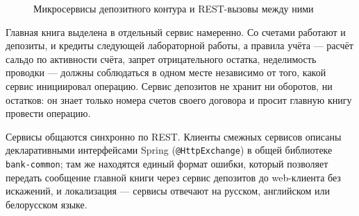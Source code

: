 \documentclass[14pt,a4paper]{extarticle}
\begin{document}
\begin{figure}[H]
\centering
{}
\caption{Микросервисы депозитного контура и REST-вызовы между ними}
\label{fig:services}
\end{figure}

Главная книга выделена в отдельный сервис намеренно. Со счетами работают и депозиты, и
кредиты следующей лабораторной работы, а правила учёта --- расчёт сальдо по активности
счёта, запрет отрицательного остатка, неделимость проводки --- должны соблюдаться в одном
месте независимо от того, какой сервис инициировал операцию. Сервис депозитов не хранит ни
оборотов, ни остатков: он знает только номера счетов своего договора и просит главную книгу
провести операцию.

Сервисы общаются синхронно по REST. Клиенты смежных сервисов описаны декларативными
интерфейсами Spring (\texttt{@HttpExchange}) в общей библиотеке \texttt{bank-common}; там же
находятся единый формат ошибки, который позволяет передать сообщение главной книги через
сервис депозитов до web-клиента без искажений, и локализация --- сервисы отвечают на
русском, английском или белорусском языке.
\end{document}
